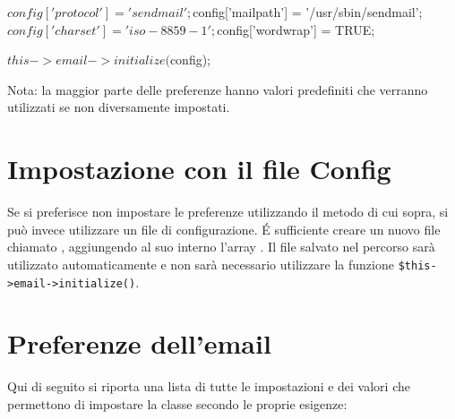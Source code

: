 \begin{code}
$config['protocol'] = 'sendmail';
$config['mailpath'] = '/usr/sbin/sendmail';
$config['charset'] = 'iso-8859-1';
$config['wordwrap'] = TRUE;

$this->email->initialize($config);
\end{code}

Nota: la maggior parte delle preferenze hanno valori predefiniti che verranno utilizzati se non diversamente impostati.

\section*{Impostazione con il file Config}
Se si preferisce non impostare le preferenze utilizzando il metodo di cui sopra, si può invece utilizzare un file di configurazione. \'E sufficiente creare un nuovo file chiamato , aggiungendo al suo interno l'array . Il file salvato nel percorso  sarà utilizzato automaticamente e non sarà necessario utilizzare la funzione \verb|$this->email->initialize()|.

\section*{Preferenze dell'email}
Qui di seguito si riporta una lista di tutte le impostazioni e dei valori che permettono di impostare la classe secondo le proprie esigenze:


